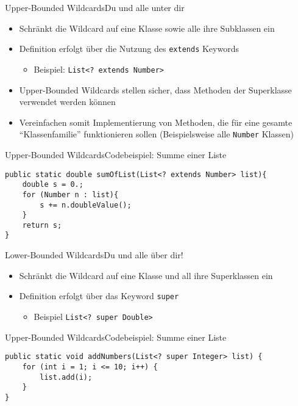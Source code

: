 \begin{frame}{Upper-Bounded Wildcards}{Du und alle unter dir}
    \begin{itemize}
        \item Schränkt die Wildcard auf eine Klasse sowie alle ihre Subklassen ein
        \item Definition erfolgt über die Nutzung des \texttt{extends} Keywords
        \begin{itemize}
            \item Beispiel: \texttt{List<? extends Number>}
        \end{itemize}
        \item Upper-Bounded Wildcards stellen sicher, dass Methoden der Superklasse verwendet werden können
        \item Vereinfachen somit Implementierung von Methoden, die für eine gesamte "`Klassenfamilie"' funktionieren sollen (Beispielsweise alle \texttt{Number} Klassen)
    \end{itemize}
\end{frame}

\begin{frame}[fragile]{Upper-Bounded Wildcards}{Codebeispiel: Summe einer Liste}
\lstset{style=java}
\begin{lstlisting}
public static double sumOfList(List<? extends Number> list){
    double s = 0.;
    for (Number n : list){
        s += n.doubleValue();
    }
    return s;
}
\end{lstlisting}
\end{frame}

\begin{frame}{Lower-Bounded Wildcards}{Du und alle über dir!}
    \begin{itemize}
        \item Schränkt die Wildcard auf eine Klasse und all ihre Superklassen ein
        \item Definition erfolgt über das Keyword \texttt{super}
        \begin{itemize}
            \item Beispiel \texttt{List<? super Double>}
        \end{itemize}
    \end{itemize}
\end{frame}

\begin{frame}[fragile]{Upper-Bounded Wildcards}{Codebeispiel: Summe einer Liste}
\lstset{style=java}
\begin{lstlisting}
public static void addNumbers(List<? super Integer> list) {
    for (int i = 1; i <= 10; i++) {
        list.add(i);
    }
}
\end{lstlisting}
\end{frame}


